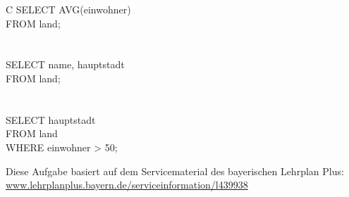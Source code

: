 {{\begin{tabularx}{\textwidth}{C}
                SELECT AVG(einwohner) \\
                FROM land; \\\\\hline\\
                SELECT name, hauptstadt \\
                FROM land;\\\\\hline\\
                SELECT hauptstadt \\
                FROM land \\
                WHERE einwohner > 50;
            \end{tabularx}
        }

        \vspace{2cm}
    \fi

    
    {\scriptsize Diese Aufgabe basiert auf dem Servicematerial des bayerischen Lehrplan Plus: \url{www.lehrplanplus.bayern.de/serviceinformation/l439938}}
}
